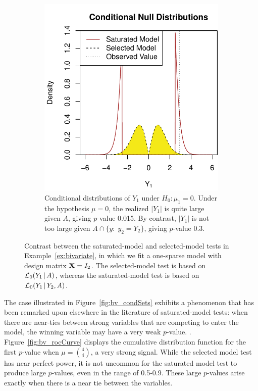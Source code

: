 \documentclass{article}
\begin{document}
\begin{figure}
\begin{subfigure}[t]{.4\textwidth}
    \includegraphics[width=\textwidth]{figs/bivariateSelVSat_nullDists.pdf}
    \caption{ 
      Conditional distributions of $Y_1$ under
      $H_0:\mu_1 = 0$. Under the hypothesis
      $\mu=0$, the realized  $|Y_1|$ is  quite large given $A$,
      giving  $p$-value 0.015. By contrast, $|Y_1|$ is not too large
      given $A \cap \{y:\; y_2=Y_2\}$, giving
      $p$-value 0.3.}
  \end{subfigure}
  \caption{ 
    Contrast between the saturated-model and selected-model tests
    in Example~\ref{ex:bivariate}, in which we fit a one-sparse model with
    design matrix $\mathbf{X}=I_2$. The selected-model test is based
    on  $\mathcal{L}_0(Y_1 \,|\, A)$, whereas the saturated-model test is based
    on $\mathcal{L}_0(Y_1  \,|\,  Y_2, A)$.}
  \label{fig:bv_nullDists}
\end{figure}


The case illustrated in Figure~\ref{fig:bv_condSets} exhibits a phenomenon that has been remarked upon elsewhere in the literature of saturated-model tests: when there are near-ties between strong variables that are competing to enter the model, the winning variable may have a very weak $p$-value. . Figure~\ref{fig:bv_rocCurve} displays the cumulative distribution function for the first $p$-value when $\mu=\binom{4}{4}$, a very strong signal. While the selected model test has near perfect power, it is not uncommon for the saturated model test to produce large $p$-values, even in the range of 0.5-0.9. These large $p$-values arise exactly when there is a near tie between the variables.
\end{document}
